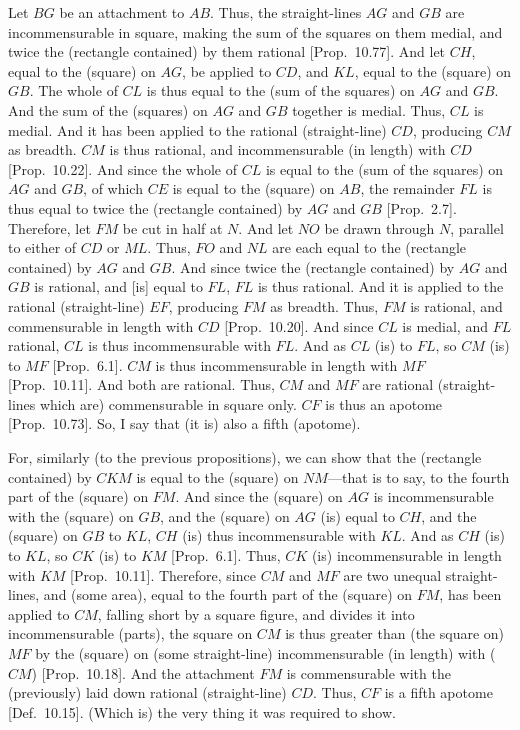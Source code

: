 \begin{Parallel}{}{}
{Let $BG$ be an attachment to $AB$. Thus, the straight-lines $AG$
and $GB$ are incommensurable in square, making the sum of the
squares on them medial, and twice the (rectangle contained) by them
rational [Prop.~10.77]. And let $CH$, equal 
to the (square) on $AG$, be applied to $CD$, and $KL$, equal
to the (square) on $GB$. The whole of $CL$
is thus equal to the (sum of the squares) on $AG$ and $GB$. 
And the sum of the (squares) on $AG$ and $GB$ together is medial. Thus, $CL$
is medial. And it has been applied to the rational (straight-line) $CD$,
producing $CM$ as breadth. $CM$ is thus rational, and incommensurable
(in length) with $CD$ [Prop.~10.22]. And since the whole
of $CL$ is equal to the (sum of the squares) on $AG$ and $GB$, of
which $CE$ is equal to the (square) on $AB$, the remainder $FL$ is
thus equal to twice the (rectangle contained) by $AG$ and $GB$ [Prop.~2.7]. Therefore, let $FM$ be
cut in half at $N$. And let $NO$ be drawn through $N$, parallel
to either of $CD$ or $ML$. Thus, $FO$ and $NL$ are each equal
to the (rectangle contained) by $AG$ and $GB$. And since twice the
(rectangle contained) by $AG$ and $GB$ is rational, and [is]
equal to $FL$, $FL$ is thus rational. And it is applied to the rational
(straight-line) $EF$, producing $FM$ as breadth. Thus, $FM$ is rational,
and commensurable in length with $CD$ [Prop.~10.20]. And since $CL$ is medial, and
$FL$ rational, $CL$ is thus incommensurable with $FL$. 
And as $CL$ (is) to $FL$, so $CM$ (is) to $MF$ [Prop.~6.1]. $CM$ is thus incommensurable in length
with $MF$ [Prop.~10.11]. And both are
rational. Thus, $CM$ and $MF$ are rational (straight-lines which are)
commensurable in square only. $CF$ is thus an apotome [Prop.~10.73].  So, I say that (it is) also
a fifth (apotome).

For, similarly (to the previous propositions), we can show that the
(rectangle contained) by $CKM$ is equal to the (square) on $NM$---that is
to say, to the fourth part of the (square) on $FM$.  And since the (square)
on $AG$ is incommensurable with the (square) on $GB$, and  the
(square) on $AG$ (is)
equal to $CH$, and the (square) on $GB$ to $KL$, $CH$ (is) thus
incommensurable with $KL$. And as $CH$ (is) to $KL$, so
$CK$ (is) to $KM$ [Prop.~6.1]. 
Thus, $CK$ (is) incommensurable in length with $KM$ [Prop.~10.11]. Therefore, since $CM$ and $MF$
are two unequal straight-lines, and (some area), equal to the
fourth part of the (square) on $FM$, has been applied to $CM$, falling
short by a square figure, and divides it into incommensurable
(parts), the square on $CM$ is thus greater than (the square on) $MF$
by the (square) on (some straight-line) incommensurable (in length)
with ($CM$) [Prop.~10.18]. And the attachment
$FM$ is commensurable with the (previously) laid down
rational (straight-line) $CD$. Thus, $CF$ is a fifth apotome [Def.~10.15]. (Which is) the very thing it was required to show.}
\end{Parallel}


